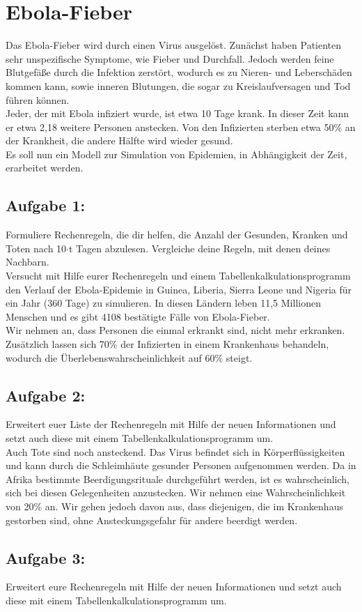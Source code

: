 \documentclass[10pt,a4paper]{article}
\begin{document}
\section*{Ebola-Fieber}
Das Ebola-Fieber wird durch einen Virus ausgelöst. Zunächst haben Patienten sehr unspezifische Symptome, wie Fieber und Durchfall. Jedoch werden feine Blutgefäße durch die Infektion zerstört, wodurch es zu Nieren- und Leberschäden kommen kann, sowie inneren Blutungen, die sogar zu Kreislaufversagen und Tod führen können.\\
Jeder, der mit Ebola infiziert wurde, ist etwa 10 Tage krank. In dieser Zeit kann er etwa 2,18 weitere Personen anstecken. Von den Infizierten sterben etwa 50\% an der Krankheit, die andere Hälfte wird wieder gesund.\\

Es soll nun ein Modell zur Simulation von Epidemien, in Abhängigkeit der Zeit, erarbeitet werden.\\
 
\subsection*{Aufgabe 1:}
Formuliere Rechenregeln, die dir helfen, die Anzahl der Gesunden, Kranken und Toten nach 10$\cdot$t Tagen abzulesen. Vergleiche deine Regeln, mit denen deines Nachbarn.\\

Versucht mit Hilfe eurer Rechenregeln und einem Tabellenkalkulationsprogramm den Verlauf der Ebola-Epidemie in Guinea, Liberia, Sierra Leone und Nigeria für ein Jahr (360 Tage) zu simulieren. In diesen Ländern leben 11,5 Millionen Menschen und es gibt 4108 bestätigte Fälle von Ebola-Fieber.\\ 

Wir nehmen an, dass Personen die einmal erkrankt sind, nicht mehr erkranken. Zusätzlich lassen sich 70\% der Infizierten in einem Krankenhaus behandeln, wodurch die Überlebenswahrscheinlichkeit auf 60\% steigt.\\
\subsection*{Aufgabe 2:}
Erweitert euer Liste der Rechenregeln mit Hilfe der neuen Informationen und setzt auch diese mit einem Tabellenkalkulationsprogramm um.\\

Auch Tote sind noch ansteckend. Das Virus befindet sich in Körperflüssigkeiten und kann durch die Schleimhäute gesunder Personen aufgenommen werden. Da in Afrika bestimmte Beerdigungsrituale durchgeführt werden, ist es wahrscheinlich, sich bei diesen Gelegenheiten anzustecken. Wir nehmen eine Wahrscheinlichkeit von 20\% an. Wir gehen jedoch davon aus, dass diejenigen, die im Krankenhaus gestorben sind, ohne Ansteckungsgefahr für andere beerdigt werden.\\
\subsection*{Aufgabe 3:}
Erweitert eure Rechenregeln mit Hilfe der neuen Informationen und setzt auch diese mit einem Tabellenkalkulationsprogramm um. 
\end{document}
